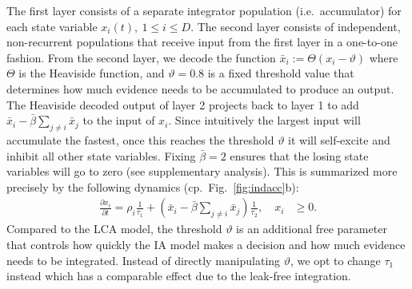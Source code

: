 \documentclass[10pt,letterpaper]{article}
\begin{document}
The first layer consists of a separate integrator population (i.e.~accumulator) for each state variable $x_i(t), \ 1 \leq i \leq D$.
The second layer consists of independent, non-recurrent populations that receive input from the first layer in a one-to-one fashion.
From the second layer, we decode the function $\bar{x}_i := \Theta(x_i - \vartheta)$ where $\Theta$ is the Heaviside function, and $\vartheta = 0.8$ is a fixed threshold value that determines how much evidence needs to be accumulated to produce an output.
The Heaviside decoded output of layer 2 projects back to layer 1 to add $\bar{x}_i - \bar{\beta} \sum_{j \neq i} \bar{x}_j$ to the input of $x_i$.
Since intuitively the largest input will accumulate the fastest, once this reaches the threshold $\vartheta$ it will self-excite and inhibit all other state variables.
Fixing $\bar{\beta} = 2$ ensures that the losing state variables will go to zero (see supplementary analysis).
This is summarized more precisely by the following dynamics (cp.~Fig.~\ref{fig:indacc}b):
\begin{equation}
    \begin{split}
        \frac{{\partial x}_i}{\partial t} = \rho_i \frac{1}{\tau_1} + \left( 
            \bar{x}_i - \bar{\beta} \sum_{j \neq i} \bar{x}_j \right) \frac{1}{\tau_2} , \quad x_i &\ge 0 .
    \end{split}
\end{equation}
Compared to the LCA model, the threshold $\vartheta$ is an additional free parameter that controls how quickly the IA model makes a decision and how much evidence needs to be integrated.
Instead of directly manipulating $\vartheta$, we opt to change $\tau_1$ instead which has a comparable effect due to the leak-free integration.
\end{document}
